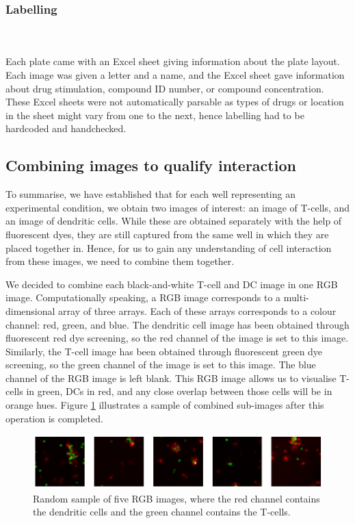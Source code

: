 \bigskip
\subsubsection{Labelling}

\hfill\\
\hfill\\
Each plate came with an Excel sheet giving information about the plate layout. Each image was given a letter and a name, and the Excel sheet gave information about drug stimulation, compound ID number, or compound concentration. These Excel sheets were not automatically parsable as types of drugs or location in the sheet might vary from one to the next, hence labelling had to be hardcoded and handchecked. 

\subsection{Combining images to qualify interaction} \label{subsec:combining}
\bigskip

To summarise, we have established that for each well representing an experimental condition, we obtain two images of interest: an image of T-cells, and an image of dendritic cells. While these are obtained separately with the help of fluorescent dyes, they are still captured from the same well in which they are placed together in. Hence, for us to gain any understanding of cell interaction from these images, we need to combine them together. 

We decided to combine each black-and-white T-cell and DC image in one RGB image. Computationally speaking, a RGB image corresponds to a multi-dimensional array of three arrays. Each of these arrays corresponds to a colour channel: red, green, and blue. The dendritic cell image has been obtained through fluorescent red dye screening, so the red channel of the image is set to this image. Similarly, the T-cell image has been obtained through fluorescent green dye screening, so the green channel of the image is set to this image. The blue channel of the RGB image is left blank. This RGB image allows us to visualise T-cells in green, DCs in red, and any close overlap between those cells will be in orange hues. Figure \ref{fig:combined} illustrates a sample of combined sub-images after this operation is completed.

\begin{figure}[h]
    \centering
    \includegraphics[width=\textwidth]{dissertation/figures/combined_cells.png}
    \caption{Random sample of five RGB images, where the red channel contains the dendritic cells and the green channel contains the T-cells.}
    \label{fig:combined}
\end{figure}

